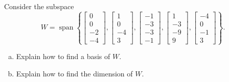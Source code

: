 
\begin{exerciseStatement}


Consider the subspace \[W=\operatorname{span}  \left\{ \left[\begin{array}{c}
0 \\
0 \\
-2 \\
-4
\end{array}\right] , \left[\begin{array}{c}
1 \\
0 \\
-4 \\
3
\end{array}\right] , \left[\begin{array}{c}
-1 \\
-3 \\
-3 \\
-1
\end{array}\right] , \left[\begin{array}{c}
1 \\
-3 \\
-9 \\
9
\end{array}\right] , \left[\begin{array}{c}
-4 \\
0 \\
-1 \\
3
\end{array}\right] \right\} .\]


\begin{enumerate}[(a)]
\item  Explain how to find a basis of \(W\).
\item  Explain how to find the dimension of \(W\).
\end{enumerate}
    
\end{exerciseStatement}
    
